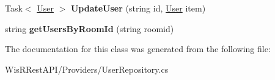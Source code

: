 \begin{DoxyCompactItemize}
\item 
\hypertarget{class_wis_r_rest_a_p_i_1_1_domain_model_1_1_user_repository_a17aca0d8c9604c41a558873778a7213b}{}Task$<$ \hyperlink{class_wis_r_1_1_domain_models_1_1_user}{User} $>$ {\bfseries Update\+User} (string id, \hyperlink{class_wis_r_1_1_domain_models_1_1_user}{User} item)\label{class_wis_r_rest_a_p_i_1_1_domain_model_1_1_user_repository_a17aca0d8c9604c41a558873778a7213b}

\item 
\hypertarget{class_wis_r_rest_a_p_i_1_1_domain_model_1_1_user_repository_a4085cce9b8c46c87173945ee4272a416}{}string {\bfseries get\+Users\+By\+Room\+Id} (string roomid)\label{class_wis_r_rest_a_p_i_1_1_domain_model_1_1_user_repository_a4085cce9b8c46c87173945ee4272a416}

\end{DoxyCompactItemize}


The documentation for this class was generated from the following file\+:\begin{DoxyCompactItemize}
\item 
Wis\+R\+Rest\+A\+P\+I/\+Providers/User\+Repository.\+cs\end{DoxyCompactItemize}

